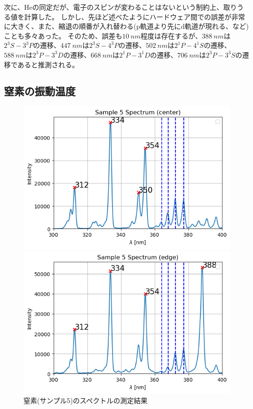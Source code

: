 \documentclass[a4paper]{ltjsarticle}
\begin{document}
次に、Heの同定だが、電子のスピンが変わることはないという制約上、取りうる値を計算した。
しかし、先ほど述べたようにハードウェア間での誤差が非常に大きく、また、縮退の順番が入れ替わる(p軌道より先にd軌道が現れる、など)ことも多々あった。
そのため、誤差も$\SI{10}{nm}$程度は存在するが、$\SI{388}{nm}$は$2^3S-3^3P$の遷移、$\SI{447}{nm}$は$2^3S-4^3P$の遷移、$\SI{502}{nm}$は$2^1P-4^1S$の遷移、
$\SI{588}{nm}$は$2^3P-3^3D$の遷移、$\SI{668}{nm}$は$2^1P-3^1D$の遷移、$\SI{706}{nm}$は$2^3P-3^3S$の遷移であると推測される。

\subsection{窒素の振動温度}
\begin{figure}[htbp]
    \centering
    \begin{minipage}[c]{0.48\columnwidth}
        \centering
        \includegraphics[width=0.95\columnwidth]{./images/spectrum_N2_center.png}
    \end{minipage}
    \begin{minipage}[c]{0.48\columnwidth}
        \centering
        \includegraphics[width=0.95\columnwidth]{./images/spectrum_N2_edge.png}
    \end{minipage}
    \caption{窒素(サンプル5)のスペクトルの測定結果}
    \label{fig:spectrum_nitrogen}
\end{figure}
\end{document}
